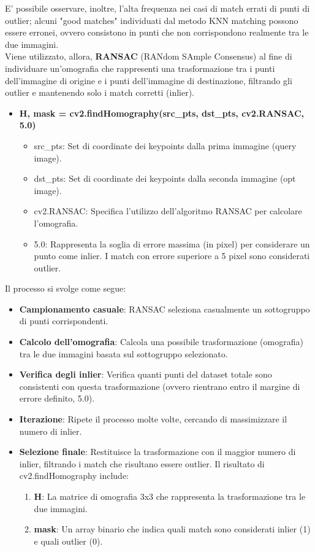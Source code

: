 \documentclass[12pt,a4paper,openright,twoside]{book}
\begin{document}
E' possibile osservare, inoltre, l'alta frequenza nei casi di match errati di punti di outlier; alcuni "good matches" individuati dal metodo KNN matching possono essere erronei, ovvero consistono in punti che non corrispondono realmente tra le due immagini. \\
Viene utilizzato, allora, \textbf{RANSAC} (RANdom SAmple Consensus) al fine di individuare un'omografia che rappresenti una trasformazione tra i punti dell'immagine di origine e i punti dell'immagine di destinazione, filtrando gli outlier e mantenendo solo i match corretti (inlier).
\begin{itemize}
\item \textbf{H, mask = cv2.findHomography(src\_pts, dst\_pts, cv2.RANSAC, 5.0)}
\begin{itemize}
\item src\_pts: Set di coordinate dei keypoints dalla prima immagine (query image).
\item dst\_pts: Set di coordinate dei keypoints dalla seconda immagine (opt image).
\item cv2.RANSAC: Specifica l'utilizzo dell'algoritmo RANSAC per calcolare l'omografia.
\item 5.0: Rappresenta la soglia di errore massima (in pixel) per considerare un punto come inlier. I match con errore superiore a 5 pixel sono considerati outlier.
\end{itemize}
\end{itemize}
Il processo si svolge come segue:
\begin{itemize}
\item \textbf{Campionamento casuale}: RANSAC seleziona casualmente un sottogruppo di punti corrispondenti.
\item \textbf{Calcolo dell'omografia}: Calcola una possibile trasformazione (omografia) tra le due immagini basata sul sottogruppo selezionato.
\item \textbf{Verifica degli inlier}: Verifica quanti punti del dataset totale sono consistenti con questa trasformazione (ovvero rientrano entro il margine di errore definito, 5.0).
\item \textbf{Iterazione}: Ripete il processo molte volte, cercando di massimizzare il numero di inlier.
\item \textbf{Selezione finale}: Restituisce la trasformazione con il maggior numero di inlier, filtrando i match che risultano essere outlier. Il risultato di cv2.findHomography include:
\begin{enumerate}
\item \textbf{H}: La matrice di omografia 3x3 che rappresenta la trasformazione tra le due immagini.
\item \textbf{mask}: Un array binario che indica quali match sono considerati inlier (1) e quali outlier (0).
\end{enumerate}
\end{itemize}
\end{document}
